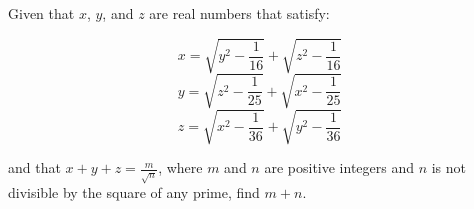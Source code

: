 Given that $x$, $y$, and $z$ are real numbers that satisfy:

\[ x=\sqrt{y^2-\frac{1}{16}}+\sqrt{z^2-\frac{1}{16}} \]
\[ y=\sqrt{z^2-\frac{1}{25}}+\sqrt{x^2-\frac{1}{25}} \]
\[ z=\sqrt{x^2-\frac{1}{36}}+\sqrt{y^2-\frac{1}{36}} \]

and that $x+y+z=\frac{m}{\sqrt{n}}$, where $m$ and $n$ are positive integers and $n$ is not divisible by the square of any prime, find $m+n$.